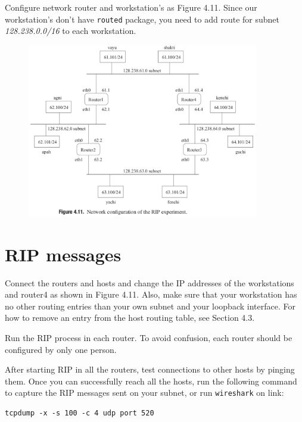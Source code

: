 \documentclass{../UTNetLab}
\begin{document}
    Configure network router and workstation’s as Figure 4.11. Since our workstation’s don’t have \lstinline{routed} package, you need to add route for subnet \textit{128.238.0.0/16} to each workstation.
    \begin{figure}[H]
        \centering
        \includegraphics[width=0.9\textwidth]{img/figure4-11.png}
    \end{figure}
\section{RIP messages}
    Connect the routers and hosts and change the IP addresses of the workstations and router4 as shown in Figure 4.11.
    Also, make sure that your workstation has no other routing entries than your own subnet and your loopback interface.
    For how to remove an entry from the host routing table, see Section 4.3.

    Run the RIP process in each router.
    To avoid confusion, each router should be configured by only one person.

    After starting RIP in all the routers, test connections to other hosts by pinging them.
    Once you can successfully reach all the hosts, run the following command to capture the RIP messages sent on your subnet, or run \lstinline{wireshark} on link:
    \begin{lstlisting}
tcpdump -x -s 100 -c 4 udp port 520
    \end{lstlisting}
\end{document}
